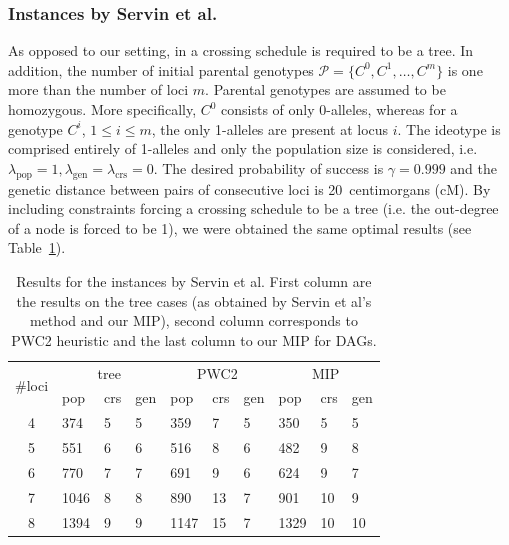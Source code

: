 \documentclass[runningheads]{llncs}
\begin{document}
\subsubsection{Instances by Servin et al.}

As opposed to our setting, in \cite{Servin:2004} a crossing schedule is required to be a tree. In addition,
 the number of initial parental genotypes $\mathcal{P} = \{ C^0, C^1,\ldots, C^m \}$ is one more than the number of loci $m$. Parental genotypes are assumed to be homozygous. More specifically, $C^0$ consists of only 0-alleles, whereas for a genotype $C^i$, $1 \leq i \leq m$, the only 1-alleles are present at locus $i$. The ideotype is comprised entirely of 1-alleles and only the population size is considered, i.e.\ $\lambda_\mathrm{pop} = 1, \lambda_\mathrm{gen} = \lambda_\mathrm{crs} = 0$. 
The desired probability of success is $\gamma=0.999$ and the genetic distance between pairs of consecutive loci is 20~centimorgans (cM). By including constraints forcing a crossing schedule to be a tree (i.e. the out-degree of a node is forced to be 1), we were obtained the same optimal results (see Table~\ref{tbl:servin}).

\begin{table}
  \center
    \small\begin{tabular}{|c||lll|lll|lll|}
    \hline
    \multirow{2}{*}{\#loci} & \multicolumn{3}{c|}{tree} & \multicolumn{3}{c|}{PWC2} & \multicolumn{3}{c|}{MIP}\\
           & pop & crs & gen & pop & crs & gen & pop & crs & gen\\
    \hline
    4 & 374  & 5 & 5 & 359  & 7 & 5 & 350  & 5 & 5\\
    5 & 551  & 6 & 6 & 516  & 8 & 6 & 482  & 9 & 8\\
    6 & 770  & 7 & 7 & 691  & 9 & 6 & 624  & 9 & 7\\
    7 & 1046 & 8 & 8 & 890  &13 & 7 & 901  &10 & 9\\
    8 & 1394 & 9 & 9 & 1147 &15 & 7 & 1329 &10 &10\\
    \hline
    \end{tabular}
  \caption{Results for the instances by Servin et al. First column are the results on the tree cases (as obtained by Servin et al's method and our MIP), second column corresponds to PWC2 heuristic and the last column to our MIP for DAGs.}
  \label{tbl:servin}
\end{table}
\end{document}
